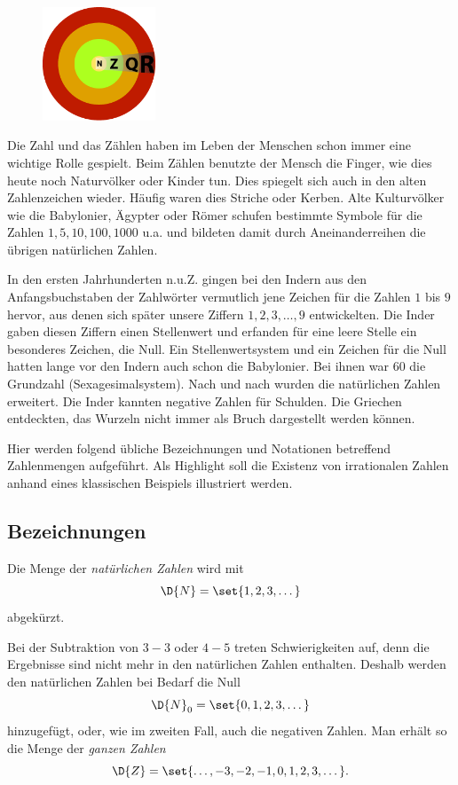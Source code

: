 \documentclass[%
11pt,%
twoside,%
titlepage,%
german,%
]{scrartcl}
\begin{document}
\begin{figure}
  \begin{center}
    \includegraphics[width=0.3\textwidth]{pictures/zahlen}
  \end{center}
\end{figure}
Die Zahl und das Z\"ahlen haben im Leben der Menschen schon immer eine wichtige Rolle gespielt. Beim Z\"ahlen benutzte der Mensch die Finger, wie dies heute noch Naturv\"olker oder Kinder tun. Dies spiegelt sich auch in den alten Zahlenzeichen wieder. H\"aufig waren dies Striche oder Kerben. Alte Kulturv\"olker wie die Babylonier, \"Agypter oder R\"omer schufen bestimmte Symbole f\"ur die Zahlen $1,5,10,100,1000$ u.a. und bildeten damit durch Aneinanderreihen die \"ubrigen nat\"urlichen Zahlen.

In den ersten Jahrhunderten n.u.Z. gingen bei den Indern aus den Anfangsbuchstaben der Zahlw\"orter vermutlich jene Zeichen f\"ur die Zahlen $1$ bis $9$ hervor, aus denen sich sp\"ater unsere Ziffern $1,2,3,\dots,9$ entwickelten. Die Inder gaben diesen Ziffern einen Stellenwert und erfanden f\"ur eine leere Stelle ein besonderes Zeichen, die Null. Ein Stellenwertsystem und ein Zeichen f\"ur die Null hatten lange vor den Indern auch schon die Babylonier. Bei ihnen war $60$ die Grundzahl (Sexagesimalsystem). Nach und nach wurden die nat\"urlichen Zahlen erweitert. Die Inder kannten negative Zahlen f\"ur Schulden. Die Griechen entdeckten, das Wurzeln nicht immer als Bruch dargestellt werden k\"onnen.

Hier werden folgend \"ubliche Bezeichnungen und Notationen betreffend Zahlenmengen aufgef\"uhrt. Als Highlight soll die Existenz von irrationalen Zahlen anhand eines klassischen Beispiels illustriert werden.
\subsection{Bezeichnungen}
Die Menge der \emph{nat\"urlichen Zahlen} wird mit
$$\D{N}=\set{1,2,3,\dots}$$
abgek\"urzt.

Bei der Subtraktion von $3-3$ oder $4-5$ treten Schwierigkeiten auf, denn die Ergebnisse sind nicht mehr in den nat\"urlichen Zahlen enthalten. Deshalb werden den nat\"urlichen Zahlen bei Bedarf die Null
$$\D{N}_0=\set{0,1,2,3,\dots}$$
hinzugef\"ugt, oder, wie im zweiten Fall, auch die negativen Zahlen. Man erh\"alt so die Menge der \emph{ganzen Zahlen}
$$\D{Z}=\set{\dots,-3,-2,-1,0,1,2,3,\dots}.$$
\end{document}
